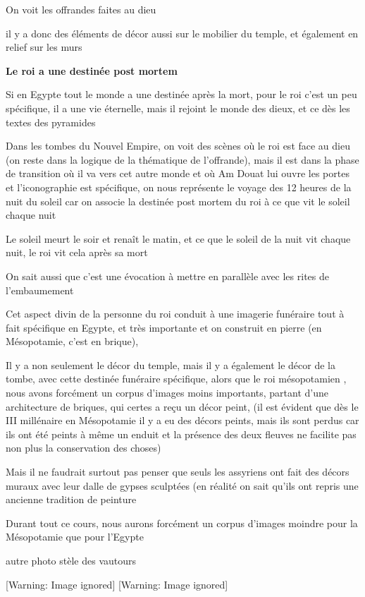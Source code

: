 \documentclass[a4paper,10pt]{article}
\begin{document}
On voit les offrandes faites au dieu

il y a donc des éléments de décor aussi sur le mobilier du temple, et
également en relief sur les murs

\textbf{Le roi a une destinée post mortem}

Si en Egypte tout le monde a une destinée après la mort, pour le roi
c'est un peu spécifique, il a une vie éternelle, mais
il rejoint le monde des dieux, et ce dès les textes des pyramides

Dans les tombes du Nouvel Empire, on voit des scènes où le roi est face
au dieu (on reste dans la logique de la thématique de 
l'offrande), mais il est dans la phase de transition
où il va vers cet autre monde et où Am Douat lui ouvre les portes et
l'iconographie est spécifique, on nous représente le
voyage des 12 heures de la nuit du soleil car on associe la destinée
post mortem du roi à ce que vit le soleil chaque nuit

Le soleil meurt le soir et renaît le matin, et ce que le soleil de la
nuit vit chaque nuit, le roi vit cela après sa mort

On sait aussi que c'est une évocation à mettre en
parallèle avec les rites de l'embaumement

Cet aspect divin de la personne du roi conduit à une imagerie funéraire
tout à fait spécifique en Egypte, et très importante et on construit en
pierre (en Mésopotamie, c'est en brique), 

Il y a non seulement le décor du temple, mais il y a également le décor
de la tombe, avec cette destinée funéraire spécifique, alors que le roi
mésopotamien , nous avons forcément un corpus d'images
moins importants, partant d'une architecture de
briques, qui certes  a reçu un décor peint,  (il est évident que dès le
III millénaire en Mésopotamie il y a eu des décors peints, mais ils
sont perdus car ils ont été peints à même un enduit et la présence des
deux fleuves ne facilite pas non plus la conservation des choses)

Mais il ne faudrait surtout pas penser que seuls les assyriens ont fait
des décors muraux avec leur dalle de gypses sculptées (en réalité on
sait qu'ils ont repris une ancienne tradition de
peinture

Durant tout ce cours, nous aurons forcément un corpus
d'images moindre pour la Mésopotamie que pour
l'Egypte

autre photo stèle des vautours

  [Warning: Image ignored] %
   [Warning: Image ignored] %
 
\end{document}
